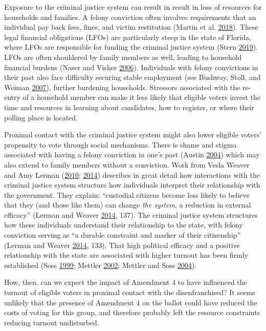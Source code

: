 \documentclass[
  12pt,
]{article}
\begin{document}
Exposure to the criminal justice system can result in result in loss of resources for households and families. A felony conviction often involves requirements that an individual pay back fees, fines, and victim restitution (Martin et al. \protect\hyperlink{ref-Martin2018}{2018}). These legal financial obligations (LFOs) are particularly steep in the state of Florida, where LFOs are responsible for funding the criminal justice system (Stern \protect\hyperlink{ref-Stern2019}{2019}). LFOs are often shouldered by family members as well, leading to household financial burdens (Naser and Visher \protect\hyperlink{ref-Naser2006}{2006}). Individuals with felony convictions in their past also face difficulty securing stable employment (see Bushway, Stoll, and Weiman \protect\hyperlink{ref-Bushway2007}{2007}), further burdening households. Stressors associated with the re-entry of a household member can make it less likely that eligible voters invest the time and resources in learning about candidates, how to register, or where their polling place is located.

Proximal contact with the criminal justice system might also lower eligible voters' propensity to vote through social mechanisms. There is shame and stigma associated with having a felony conviction in one's past (Austin \protect\hyperlink{ref-Austin2004}{2004}) which may also extend to family members without a conviction. Work from Vesla Weaver and Amy Lerman (\protect\hyperlink{ref-Weaver2010}{2010}; \protect\hyperlink{ref-Lerman2014}{2014}) describes in great detail how interactions with the criminal justice system structure how individuals interpret their relationship with the government. They explain: ``custodial citizens become less likely to believe that they (and those like them) can change \emph{the system}, a reduction in external efficacy'' (Lerman and Weaver \protect\hyperlink{ref-Lerman2014}{2014}, 137). The criminal justice system structures how these individuals understand their relationship to the state, with felony conviction serving as ``a durable constraint and marker of their citizenship'' (Lerman and Weaver \protect\hyperlink{ref-Lerman2014}{2014}, 133). That high political efficacy and a positive relationship with the state are associated with higher turnout has been firmly established (Soss \protect\hyperlink{ref-Soss1999}{1999}; Mettler \protect\hyperlink{ref-Mettler2002}{2002}; Mettler and Soss \protect\hyperlink{ref-Mettler2004}{2004}).

How, then, can we expect the impact of Amendment 4 to have influenced the turnout of eligible voters in proximal contact with the disenfranchised? It seems unlikely that the presence of Amendment 4 on the ballot could have reduced the costs of voting for this group, and therefore probably left the resource constraints reducing turnout undisturbed.
\end{document}
